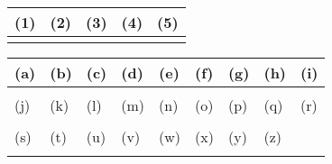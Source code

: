

\begin{table}[htb]
    \begin{center} 
      \begin{tabular}{|p{}|p{}|p{}|p{}|p{}|} \hline
        (1) & (2) & (3) & (4) & (5)\\ \hline \hline
          &  & & &  \\ \hline		
      \end{tabular}
    \end{center}
  \end{table}

  \begin{table}[htb]
    \begin{center} 
      \begin{tabular}{|p{}|p{}|p{}|p{}|p{}|p{}|p{}|p{}|p{}|} \hline
        (a) & (b) & (c) & (d) & (e) & (f) & (g) & (h) & (i)\\ \hline
          &  & & & & & & &  \\ \hline		
        (j) & (k) & (l) & (m) & (n) & (o) & (p) & (q) & (r)\\ \hline
        &  & & & & & & & \\ \hline		
        (s) & (t) & (u) & (v) & (w) & (x) & (y) & (z) & \\ \hline
        &  & & & & & & & \\ \hline	
    \end{tabular}
    \end{center}
  \end{table}


